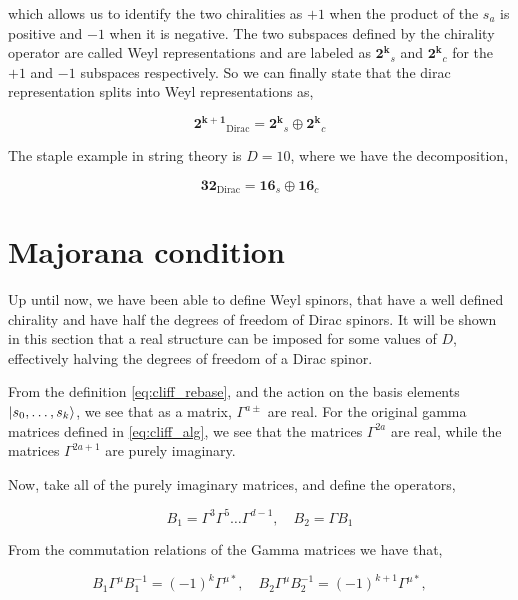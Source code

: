 which allows us to identify the two chiralities as $+1$ when the product of the $s_a$ is positive and $-1$ when it is negative. The two subspaces defined by the chirality operator are called Weyl representations and are labeled as $\mathbf{2^k}_s$ and $\mathbf{2^k}_c$ for the $+1$ and $-1$ subspaces respectively. So we can finally state that the dirac representation splits into Weyl representations as,

\begin{equation}
    \mathbf{2^{k+1}}_\text{Dirac} = \mathbf{2^k}_s \oplus \mathbf{2^k}_c
\end{equation}

The staple example in string theory is $D=10$, where we have the decomposition,

\begin{equation}
    \mathbf{32}_{\text{Dirac}} = \mathbf{16}_s \oplus \mathbf{16}_c
\end{equation}

\section{Majorana condition}

Up until now, we have been able to define Weyl spinors, that have a well defined chirality and have half the degrees of freedom of Dirac spinors. It will be shown in this section that a real structure can be imposed for some values of $D$, effectively halving the degrees of freedom of a Dirac spinor.

From the definition \ref{eq:cliff_rebase}, and the action on the basis elements $\lvert s_0,\dots, s_k\rangle$, we see that as a matrix, $\Gamma^{a\pm}$ are real. For the original gamma matrices defined in \ref{eq:cliff_alg}, we see that the matrices $\Gamma^{2a}$ are real, while the matrices $\Gamma^{2a+1}$ are purely imaginary.

Now, take all of the purely imaginary matrices, and define the operators,

\begin{equation}
    B_1=\Gamma^3 \Gamma^5 \ldots \Gamma^{d-1}, \quad B_2=\Gamma B_1
\end{equation}

From the commutation relations of the Gamma matrices we have that,

\begin{equation}
    B_1\Gamma^\mu B_1^{-1}=(-1)^k\Gamma^{\mu*},\quad B_2\Gamma^\mu B_2^{-1}=(-1)^{k+1}\Gamma^{\mu*},
\end{equation}

